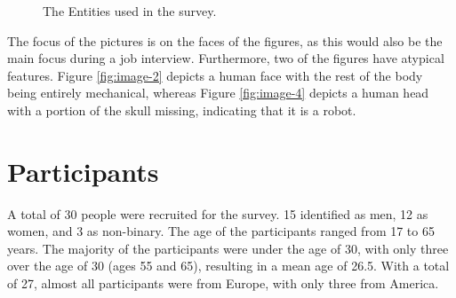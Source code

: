 \begin{figure}[t!]
 \centering
 \qquad
 \qquad
      
\caption{The Entities used in the survey.}
\label{fig:used-entities}

\end{figure}
The focus of the pictures is on the faces of the figures, as this would also be the main focus during a job interview. Furthermore, two of the figures have atypical features. Figure \ref{fig:image-2} depicts a human face with the rest of the body being entirely mechanical, whereas Figure \ref{fig:image-4} depicts a human head with a portion of the skull missing, indicating that it is a robot.

\section{Participants}
A total of 30 people were recruited for the survey. 15 identified as  men, 12 as women, and 3 as non-binary. The age of the participants ranged from 17 to 65 years. The majority of the participants were under the age of 30, with only three over the age of 30 (ages 55 and 65), resulting in a mean age of 26.5. With a total of 27, almost all participants were from Europe, with only three from America.


